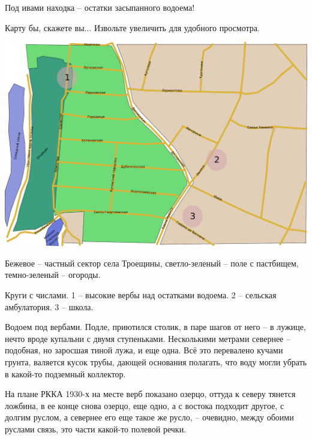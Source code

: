 Под ивами находка – остатки засыпанного водоема!


Карту бы, скажете вы... Извольте увеличить для удобного просмотра.

\begin{center}
\includegraphics[width=\linewidth]{chast-gorodki/gnilusha/gni-big2.pdf}
\end{center}

Бежевое – частный сектор села Троещины, светло-зеленый – поле с пастбищем, темно-зеленый – огороды.

Круги с числами. 1 – высокие вербы над остатками водоема. 2 – сельская амбулатория. 3 – школа.

Водоем под вербами. Подле, приютился столик, в паре шагов от него – в лужице, нечто вроде купальни с двумя ступеньками. Несколькими метрами севернее – подобная, но заросшая тиной лужа, и еще одна. Всё это перевалено кучами грунта, валяется кусок трубы, дающей основания полагать, что воду могли убрать в какой-то подземный коллектор. 

На плане РККА 1930-х на месте верб показано озерцо, оттуда к северу тянется ложбина, в ее конце снова озерцо, еще одно, а с востока подходит другое, с долгим руслом, а севернее его еще такое же русло,  – очевидно, между обоими руслами связь, это части какой-то полевой речки.

